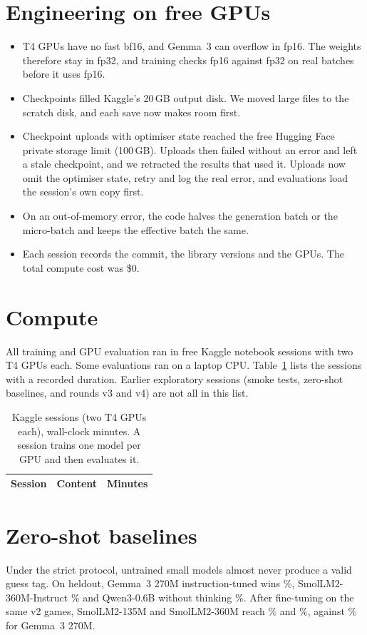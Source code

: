 \documentclass{article}
\newcommand{\W}[3]{\R{#1:hf-sft-gemma270m-#2-best#3:win}}
\begin{document}
\section{Engineering on free GPUs}
\label{app:engineering}
\begin{itemize}
\item T4 GPUs have no fast bf16, and Gemma~3 can overflow in fp16. The weights therefore stay in fp32, and training checks fp16 against fp32 on real batches before it uses fp16.
\item Checkpoints filled Kaggle's 20\,GB output disk. We moved large files to the scratch disk, and each save now makes room first.
\item Checkpoint uploads with optimiser state reached the free Hugging Face private storage limit (100\,GB). Uploads then failed without an error and left a stale checkpoint, and we retracted the results that used it. Uploads now omit the optimiser state, retry and log the real error, and evaluations load the session's own copy first.
\item On an out-of-memory error, the code halves the generation batch or the micro-batch and keeps the effective batch the same.
\item Each session records the commit, the library versions and the GPUs. The total compute cost was \$0.
\end{itemize}

\section{Compute}
\label{app:compute}
All training and GPU evaluation ran in free Kaggle notebook sessions with two T4 GPUs each. Some evaluations ran on a laptop CPU. Table~\ref{tab:sessions} lists the sessions with a recorded duration. Earlier exploratory sessions (smoke tests, zero-shot baselines, and rounds v3 and v4) are not all in this list.

\begin{table}[H]
\centering\small
\caption{Kaggle sessions (two T4 GPUs each), wall-clock minutes. A session trains one model per GPU and then evaluates it.}
\label{tab:sessions}
\begin{tabular}{llr}
\toprule
Session & Content & Minutes \\
\midrule

\end{tabular}
\end{table}

\section{Zero-shot baselines}
Under the strict protocol, untrained small models almost never produce a valid guess tag. On heldout, Gemma~3 270M instruction-tuned wins \%, SmolLM2-360M-Instruct \citep{allal2025smollm2} \% and Qwen3-0.6B without thinking \citep{qwen3} \%. After fine-tuning on the same v2 games, SmolLM2-135M and SmolLM2-360M reach \% and \%, against \W{heldout}{v2}{}\% for Gemma~3 270M.
\end{document}
